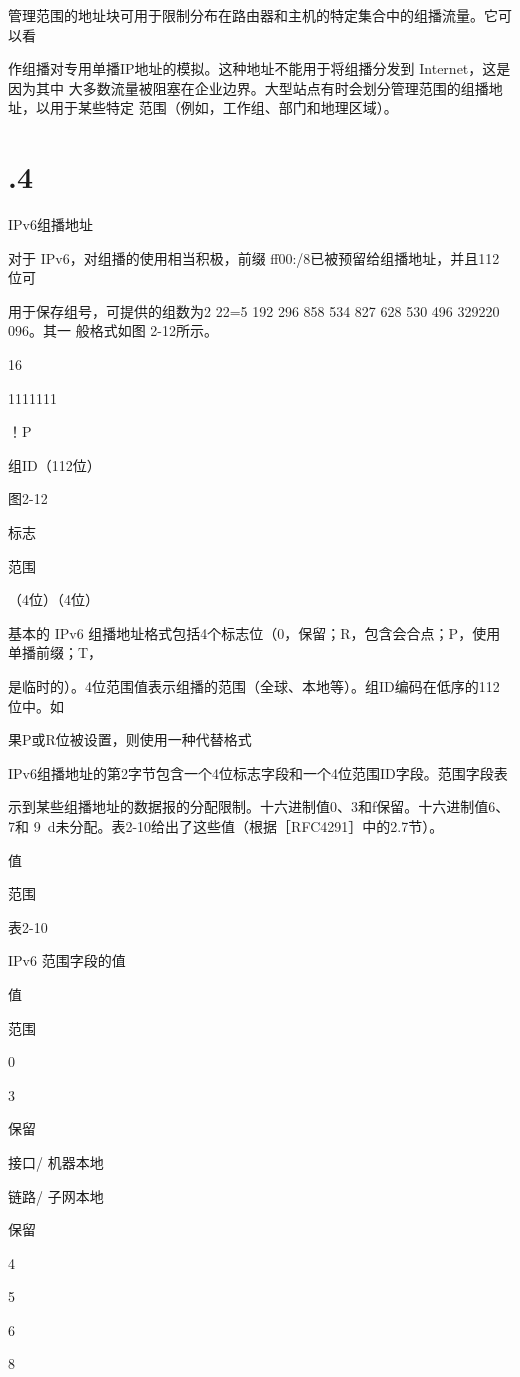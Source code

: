 管理范围的地址块可用于限制分布在路由器和主机的特定集合中的组播流量。它可以看

作组播对专用单播IP地址的模拟。这种地址不能用于将组播分发到 Internet，这是因为其中
大多数流量被阻塞在企业边界。大型站点有时会划分管理范围的组播地址，以用于某些特定
范围（例如，工作组、部门和地理区域）。

\section{.4}
IPv6组播地址

对于 IPv6，对组播的使用相当积极，前缀 ff00:/8已被预留给组播地址，并且112位可

用于保存组号，可提供的组数为2 22=5 192 296 858 534 827 628 530 496 329220 096。其一
般格式如图 2-12所示。

16

1111111

！P

组ID（112位）

图2-12

标志

范围

（4位）（4位）

基本的 IPv6 组播地址格式包括4个标志位（0，保留；R，包含会合点；P，使用单播前缀；T，

是临时的）。4位范围值表示组播的范围（全球、本地等）。组ID编码在低序的112位中。如

果P或R位被设置，则使用一种代替格式

IPv6组播地址的第2字节包含一个4位标志字段和一个4位范围ID字段。范围字段表

示到某些组播地址的数据报的分配限制。十六进制值0、3和f保留。十六进制值6、7和
9~d未分配。表2-10给出了这些值（根据［RFC4291］中的2.7节）。

值

范围

表2-10

IPv6 范围字段的值

值

范围

0

3

保留

接口/ 机器本地

链路/ 子网本地

保留

4

5

6

8

